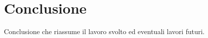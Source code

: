 \chapter{Conclusione}\label{chapter:conclusione}
Conclusione che riassume il lavoro svolto ed eventuali lavori futuri.

\blindtext %
\blindtext %